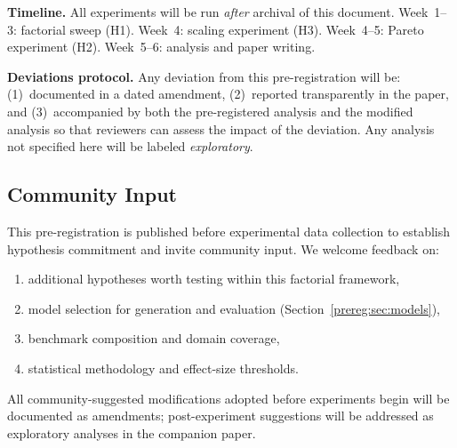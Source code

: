 \textbf{Timeline.}
All experiments will be run \textit{after} archival of this document.
Week~1--3: factorial sweep (H1).
Week~4: scaling experiment (H3).
Week~4--5: Pareto experiment (H2).
Week~5--6: analysis and paper writing.

\textbf{Deviations protocol.}
Any deviation from this pre-registration will be: (1)~documented in a
dated amendment, (2)~reported transparently in the paper, and
(3)~accompanied by both the pre-registered analysis and the modified
analysis so that reviewers can assess the impact of the deviation.
Any analysis not specified here will be labeled \textit{exploratory}.

\subsection*{Community Input}

This pre-registration is published before experimental data collection
to establish hypothesis commitment and invite community input.
We welcome feedback on:
\begin{enumerate}[nosep,leftmargin=1.5em]
  \item additional hypotheses worth testing within this factorial
    framework,
  \item model selection for generation and evaluation
    (Section~\ref{prereg:sec:models}),
  \item benchmark composition and domain coverage,
  \item statistical methodology and effect-size thresholds.
\end{enumerate}
All community-suggested modifications adopted before experiments begin
will be documented as amendments; post-experiment suggestions will be
addressed as exploratory analyses in the companion paper.

